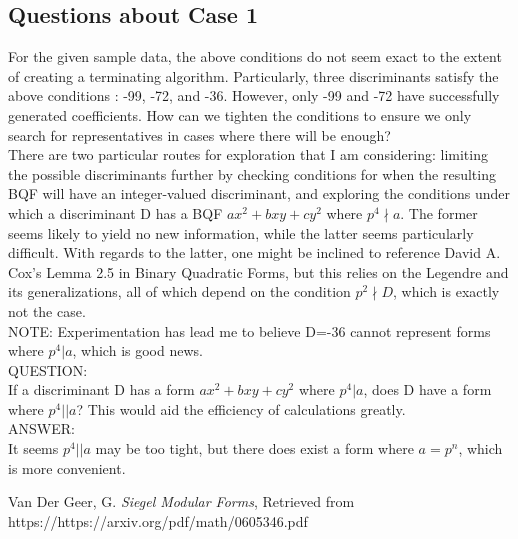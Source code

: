 \documentclass[11pt, oneside]{amsart}
\begin{document}
\subsection{Questions about Case 1}
For the given sample data, the above conditions do not seem exact to the extent of creating a terminating algorithm. Particularly, three discriminants satisfy the above conditions : -99, -72, and -36. However, only -99 and -72 have successfully generated coefficients. How can we tighten the conditions to ensure we only search for representatives in cases where there will be enough?
\\
There are two particular routes for exploration that I am considering: limiting the possible discriminants further by checking conditions for when the resulting BQF will have an integer-valued discriminant, and exploring the conditions under which a discriminant D has a BQF $ax^2+bxy+cy^2$ where $p^4\nmid a$. The former seems likely to yield no new information, while the latter seems particularly difficult. With regards to the latter, one might be inclined to reference David A. Cox's Lemma 2.5 in Binary Quadratic Forms, but this relies on the Legendre and its generalizations, all of which depend on the condition $p^2\nmid D$, which is exactly not the case.
\\
NOTE: Experimentation has lead me to believe D=-36 cannot represent forms where $p^4\vert a$, which is good news.
\\
QUESTION:
\\
If a discriminant D has a form $ax^2+bxy+cy^2$ where $p^4\vert a$, does D have a form where $p^4 \vert \vert a$? This would aid the efficiency of calculations greatly.
\\
ANSWER:
\\
It seems $p^4 \vert \vert a$ may be too tight, but there does exist a form where $a = p^n$, which is more convenient. 
\pagebreak

\begin{thebibliography}{XXXX}

 {Van Der Geer, G.} {\em Siegel Modular Forms}, Retrieved from https://https://arxiv.org/pdf/math/0605346.pdf

\end{thebibliography}
\end{document}
